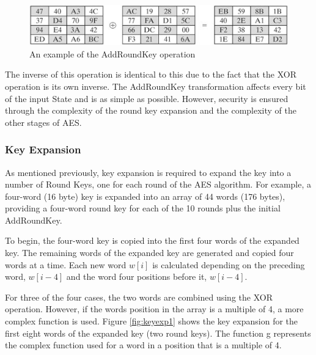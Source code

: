 \documentclass[a4paper,10pt]{report}
\begin{document}
\begin{figure}[htb]
\centering
\includegraphics[scale=0.7]{images/addroundkey1.jpg}
\caption{An example of the AddRoundKey operation}
\label{fig:addroundkey1}
\end{figure}

The inverse of this operation is identical to this due to the fact that the XOR operation is its own inverse. The AddRoundKey transformation affects every bit of the input State and is as simple as possible. However, security is ensured through the complexity of the round key expansion and the complexity of the other stages of AES. 

\subsubsection{Key Expansion}

As mentioned previously, key expansion is required to expand the key into a number of Round Keys, one for each round of the AES algorithm. For example, a four-word (16 byte) key is expanded into an array of 44 words (176 bytes), providing a four-word round key for each of the 10 rounds plus the initial AddRoundKey. 

To begin, the four-word key is copied into the first four words of the expanded key. The remaining words of the expanded key are generated and copied four words at a time. Each new word $w[i]$ is calculated depending on the preceding word, $w[i-4]$ and the word four positions before it, $w[i-4]$. 

For three of the four cases, the two words are combined using the XOR operation. However, if the words position in the array is a multiple of 4, a more complex function is used. Figure \ref{fig:keyexp1} shows the key expansion for the first eight words of the expanded key (two round keys). The function g represents the complex function used for a word in a position that is a multiple of 4.
\end{document}
